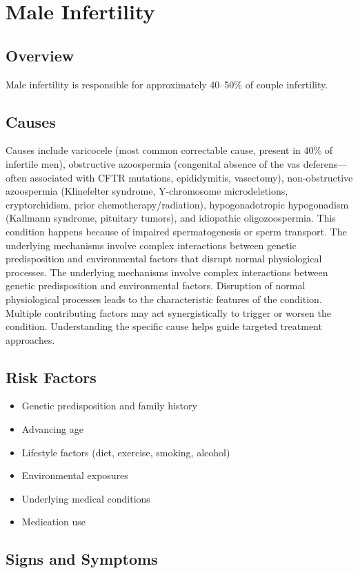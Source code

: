 \chapter{Male Infertility}
\label{sec:Male Infertility}

\section{Overview}
Male infertility is responsible for approximately 40--50\% of couple infertility.
\section{Causes}
Causes include varicocele (most common correctable cause, present in 40\% of infertile men), obstructive azoospermia (congenital absence of the vas deferens---often associated with CFTR mutations, epididymitis, vasectomy), non-obstructive azoospermia (Klinefelter syndrome, Y-chromosome microdeletions, cryptorchidism, prior chemotherapy/radiation), hypogonadotropic hypogonadism (Kallmann syndrome, pituitary tumors), and idiopathic oligozoospermia. This condition happens because of impaired spermatogenesis or sperm transport. The underlying mechanisms involve complex interactions between genetic predisposition and environmental factors that disrupt normal physiological processes. The underlying mechanisms involve complex interactions between genetic predisposition and environmental factors. Disruption of normal physiological processes leads to the characteristic features of the condition. Multiple contributing factors may act synergistically to trigger or worsen the condition. Understanding the specific cause helps guide targeted treatment approaches.
\section{Risk Factors}


\begin{itemize}[noitemsep]
  \item Genetic predisposition and family history
  \item Advancing age
  \item Lifestyle factors (diet, exercise, smoking, alcohol)
  \item Environmental exposures
  \item Underlying medical conditions
  \item Medication use
\end{itemize}
\section{Signs and Symptoms}

